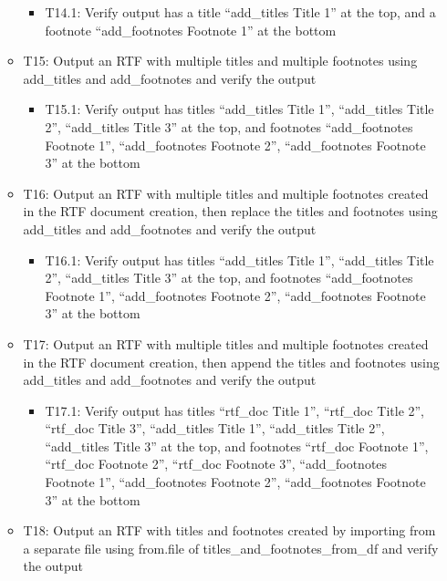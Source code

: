 \documentclass[]{article}
\providecommand{\tightlist}{%
  \setlength{\itemsep}{0pt}\setlength{\parskip}{0pt}}
\begin{document}
\begin{itemize}
\begin{itemize}
    \begin{itemize}
    \tightlist
    \item
      T14.1: Verify output has a title ``add\_titles Title 1'' at the
      top, and a footnote ``add\_footnotes Footnote 1'' at the bottom
    \end{itemize}
  \item
    T15: Output an RTF with multiple titles and multiple footnotes using
    add\_titles and add\_footnotes and verify the output

    \begin{itemize}
    \tightlist
    \item
      T15.1: Verify output has titles ``add\_titles Title 1'',
      ``add\_titles Title 2'', ``add\_titles Title 3'' at the top, and
      footnotes ``add\_footnotes Footnote 1'', ``add\_footnotes Footnote
      2'', ``add\_footnotes Footnote 3'' at the bottom
    \end{itemize}
  \item
    T16: Output an RTF with multiple titles and multiple footnotes
    created in the RTF document creation, then replace the titles and
    footnotes using add\_titles and add\_footnotes and verify the output

    \begin{itemize}
    \tightlist
    \item
      T16.1: Verify output has titles ``add\_titles Title 1'',
      ``add\_titles Title 2'', ``add\_titles Title 3'' at the top, and
      footnotes ``add\_footnotes Footnote 1'', ``add\_footnotes Footnote
      2'', ``add\_footnotes Footnote 3'' at the bottom
    \end{itemize}
  \item
    T17: Output an RTF with multiple titles and multiple footnotes
    created in the RTF document creation, then append the titles and
    footnotes using add\_titles and add\_footnotes and verify the output

    \begin{itemize}
    \tightlist
    \item
      T17.1: Verify output has titles ``rtf\_doc Title 1'', ``rtf\_doc
      Title 2'', ``rtf\_doc Title 3'', ``add\_titles Title 1'',
      ``add\_titles Title 2'', ``add\_titles Title 3'' at the top, and
      footnotes ``rtf\_doc Footnote 1'', ``rtf\_doc Footnote 2'',
      ``rtf\_doc Footnote 3'', ``add\_footnotes Footnote 1'',
      ``add\_footnotes Footnote 2'', ``add\_footnotes Footnote 3'' at
      the bottom
    \end{itemize}
  \item
    T18: Output an RTF with titles and footnotes created by importing
    from a separate file using from.file of
    titles\_and\_footnotes\_from\_df and verify the output


\end{itemize}
\end{itemize}
\end{document}
